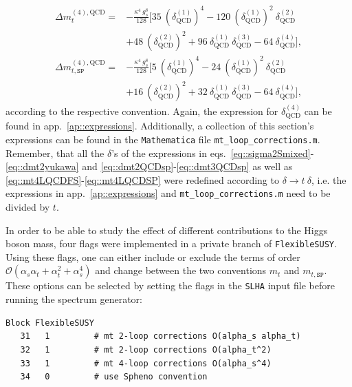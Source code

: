 \documentclass[a4paper,12pt]{book}
\begin{document}
\begin{align}
\nonumber
\Delta m_t^{(4),\text{QCD}} ={}& -\frac{\kappa^4 \> g_s^8}{128}\biggl[35\>\left(\delta^{(1)}_\text{QCD}\right)^4-120\> \left(\delta^{(1)}_\text{QCD}\right)^2 \> \delta^{(2)}_\text{QCD}\\
\label{eq::mt4LQCDFS}
&+48\>\left(\delta^{(2)}_\text{QCD}\right)^2+96\> \delta^{(1)}_\text{QCD} \> \delta^{(3)}_\text{QCD}-64\> \delta^{(4)}_\text{QCD}\biggr],\\
\nonumber
\Delta m_{t,\texttt{SP}}^{(4),\text{QCD}} ={}& -\frac{\kappa^4 \> g_s^8}{128}\biggl[5\>\left(\delta^{(1)}_\text{QCD}\right)^4-24\> \left(\delta^{(1)}_\text{QCD}\right)^2 \> \delta^{(2)}_\text{QCD}\\
\label{eq::mt4LQCDSP}
&+16\>\left(\delta^{(2)}_\text{QCD}\right)^2+32\> \delta^{(1)}_\text{QCD} \> \delta^{(3)}_\text{QCD}-64\> \delta^{(4)}_\text{QCD}\biggr],
\end{align}  
according to the respective convention. Again, the expression for $\delta^{(4)}_\text{QCD}$ can be found in app.\ \ref{ap::expressions}. Additionally, a collection of this section's expressions can be found in the \texttt{Mathematica} file \texttt{mt\_loop\_corrections.m}. Remember, that all the $\delta$'s of the expressions in eqs.\ \eqref{eq::sigma2Smixed}-\eqref{eq::dmt2yukawa} and \eqref{eq::dmt2QCDsp}-\eqref{eq::dmt3QCDsp} as well as \eqref{eq::mt4LQCDFS}-\eqref{eq::mt4LQCDSP} were redefined according to $\delta \rightarrow t \> \delta$, i.e. the expressions in app.\ \ref{ap::expressions} and \texttt{mt\_loop\_corrections.m} need to be divided by $t$.\par
In order to be able to study the effect of different contributions to the Higgs boson mass, four flags were implemented in a private branch of \texttt{FlexibleSUSY}. Using these flags, one can either include or exclude the terms of order $\mathcal{O}(\alpha_s\alpha_t+\alpha_t^2+\alpha_s^4)$ and change between the two conventions $m_t$ and $m_{t,\texttt{SP}}$. These options can be selected by setting the flags in the \texttt{SLHA} input file before running the spectrum generator:
\begin{center}
%
\begin{lstlisting}[numbers=none]
Block FlexibleSUSY
   31   1         # mt 2-loop corrections O(alpha_s alpha_t)
   32   1         # mt 2-loop corrections O(alpha_t^2)
   33   1         # mt 4-loop corrections O(alpha_s^4)
   34   0         # use Spheno convention
\end{lstlisting}
%
\end{center}
\end{document}

